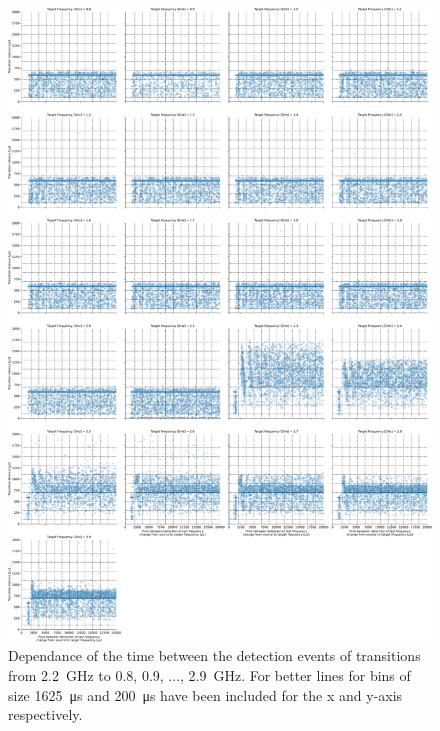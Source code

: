\begin{figure}[]
    \centering
    \includegraphics[width=\columnwidth]{fig/ftalat_scatter_wait_transition_latency_hati_source_2.2.pdf}
    \caption{Dependance of the time between the detection events of transitions from \SI{2.2}{\GHz} to \SI{0.8}{}, \SI{0.9}{}, ..., \SI{2.9}{\GHz}. For better lines for bins of size \SI{1625}{\us} and \SI{200}{\us} have been included for the x and y-axis respectively.}
\end{figure}

